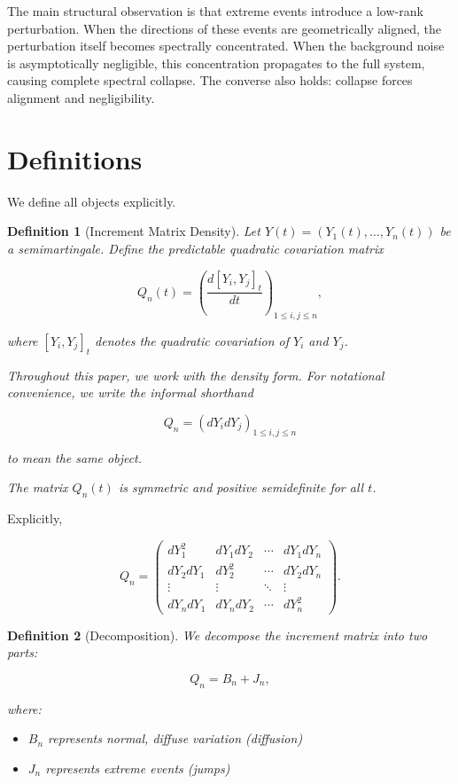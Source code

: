 \documentclass{article}
\newtheorem{definition}{Definition}
\begin{document}
The main structural observation is that extreme events introduce a low-rank perturbation. When the directions of these events are geometrically aligned, the perturbation itself becomes spectrally concentrated. When the background noise is asymptotically negligible, this concentration propagates to the full system, causing complete spectral collapse. The converse also holds: collapse forces alignment and negligibility.

\section{Definitions}

We define all objects explicitly.

\begin{definition}[Increment Matrix Density]
Let \(Y(t) = (Y_1(t), \dots, Y_n(t))\) be a semimartingale. Define the predictable quadratic covariation matrix

\[
Q_n(t) = \left( \frac{d[Y_i, Y_j]_t}{dt} \right)_{1 \le i,j \le n},
\]

where \([Y_i, Y_j]_t\) denotes the quadratic covariation of \(Y_i\) and \(Y_j\). 

Throughout this paper, we work with the density form. For notational convenience, we write the informal shorthand

\[
Q_n = (dY_i dY_j)_{1 \le i,j \le n}
\]

to mean the same object.

The matrix \(Q_n(t)\) is symmetric and positive semidefinite for all \(t\).
\end{definition}

Explicitly,

\[
Q_n =
\begin{pmatrix}
dY_1^2 & dY_1 dY_2 & \cdots & dY_1 dY_n \\
dY_2 dY_1 & dY_2^2 & \cdots & dY_2 dY_n \\
\vdots & \vdots & \ddots & \vdots \\
dY_n dY_1 & dY_n dY_2 & \cdots & dY_n^2
\end{pmatrix}.
\]

\begin{definition}[Decomposition]
We decompose the increment matrix into two parts:

\[
Q_n = B_n + J_n,
\]

where:
\begin{itemize}
\item \(B_n\) represents normal, diffuse variation (diffusion)
\item \(J_n\) represents extreme events (jumps)
\end{itemize}
\end{definition}
\end{document}

